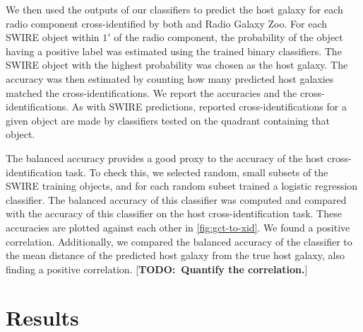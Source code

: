 \documentclass[fleqn,usenatbib,usedcolumn]{mnras}
\newcommand{\todo}[1]{ {\color{red}[{\bf TODO:~{#1}}]} }
\begin{document}
    We then used the outputs of our classifiers to predict the host galaxy
    for each radio component cross-identified by both \citet{norris06}
    and Radio Galaxy Zoo. For each SWIRE object within $1'$ of the radio
    component, the probability of the object having a positive label was
    estimated using the trained binary classifiers. The SWIRE object with
    the highest probability was chosen as the host galaxy. The accuracy was
    then estimated by counting how many predicted host galaxies matched the
    \citet{norris06} cross-identifications. We report the accuracies and the
    cross-identifications. As with SWIRE predictions, reported
    cross-identifications for a given object are made by classifiers tested
    on the quadrant containing that object.

    The balanced accuracy provides a good proxy to the accuracy of the host
    cross-identification task. To check this, we selected random, small
    subsets of the SWIRE training objects, and for each random subset trained
    a logistic regression classifier. The balanced accuracy of this classifier
    was computed and compared with the accuracy of this classifier on the host
    cross-identification task. These accuracies are plotted against each other
    in \autoref{fig:gct-to-xid}. We found a positive correlation.
    Additionally, we compared the balanced accuracy of the classifier to the
    mean distance of the predicted host galaxy from the true host galaxy, also
    finding a positive correlation. \todo{Quantify the correlation.}

\section{Results}\label{results}
\end{document}
